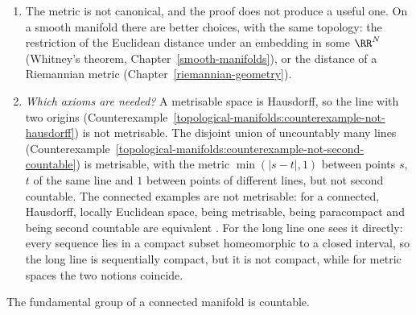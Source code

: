 \begin{remark}\label{topological-manifolds:remark-metrisable}
\begin{enumerate}
\item The metric is not canonical, and the proof does not produce a useful one. On a smooth manifold there are better choices, with the same topology: the restriction of the Euclidean distance under an
embedding in some $\RR^N$ (Whitney's theorem, Chapter~\ref{smooth-manifolds}), or the distance of a Riemannian metric (Chapter~\ref{riemannian-geometry}).
\item \emph{Which axioms are needed?} A metrisable space is Hausdorff, so the line with two origins (Counterexample~\ref{topological-manifolds:counterexample-not-hausdorff}) is not metrisable. The
disjoint union of uncountably many lines (Counterexample~\ref{topological-manifolds:counterexample-not-second-countable}) is metrisable, with the metric $\min(|s - t|, 1)$ between points $s$, $t$ of the same line and $1$ between points of different
lines, but not second countable. The connected examples are not metrisable: for a connected, Hausdorff, locally Euclidean space, being metrisable, being paracompact and being second countable are equivalent
\cite[Appendix A]{spivak-comprehensive-1}. For the long line one sees it directly: every sequence lies in a compact subset homeomorphic to a closed interval, so the long line is sequentially compact, but it is not compact,
while for metric spaces the two notions coincide.
\end{enumerate}
\end{remark}

\begin{theorem}\label{topological-manifolds:theorem-countable-fundamental-group}
The fundamental group of a connected manifold is countable.
\end{theorem}

